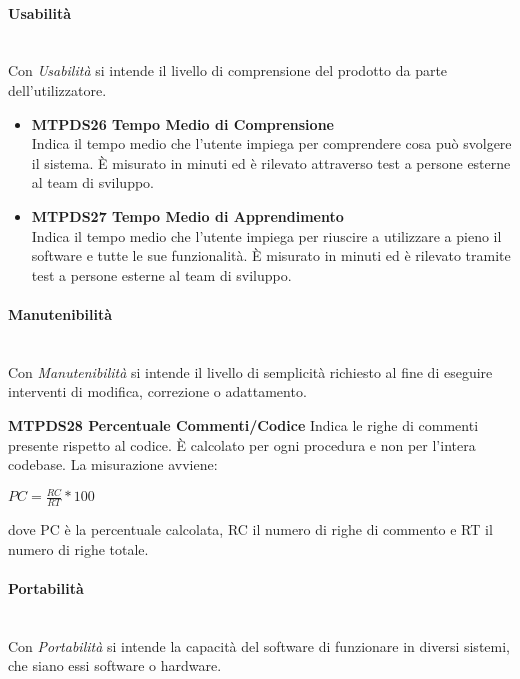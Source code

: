 \paragraph{Usabilità}\-\\
Con \textit{Usabilità} si intende il livello di comprensione del prodotto da parte dell'utilizzatore.
\begin{itemize}
	\item\textbf{MTPDS26 Tempo Medio di Comprensione}\-\\
Indica il tempo medio che l'utente impiega per comprendere cosa può svolgere il sistema. È misurato in minuti ed è rilevato attraverso test a persone esterne al team di sviluppo.

	\item\textbf{MTPDS27 Tempo Medio di Apprendimento}\-\\
Indica il tempo medio che l'utente impiega per riuscire a utilizzare a pieno il software e tutte le sue funzionalità. È  misurato in minuti ed è rilevato tramite test a persone esterne al team di sviluppo. 

\end{itemize}

\paragraph{Manutenibilità}\-\\
Con \textit{Manutenibilità} si intende il livello di semplicità richiesto al fine di eseguire interventi di modifica, correzione o adattamento.
\begin{itemize}
	\item \textbf{MTPDS28 Percentuale Commenti/Codice}
	Indica le righe di commenti presente rispetto al codice. È  calcolato per ogni procedura e non per l'intera codebase. La misurazione avviene:
	\begin{center}
		\item $PC = \frac{RC}{RT}*100$
	\end{center}
	dove PC è la percentuale calcolata, RC il numero di righe di commento e RT il numero di righe totale.
\end{itemize}

\paragraph{Portabilità}\-\\
Con \textit{Portabilità} si intende la capacità del software di funzionare in diversi sistemi, che siano essi software o hardware.
